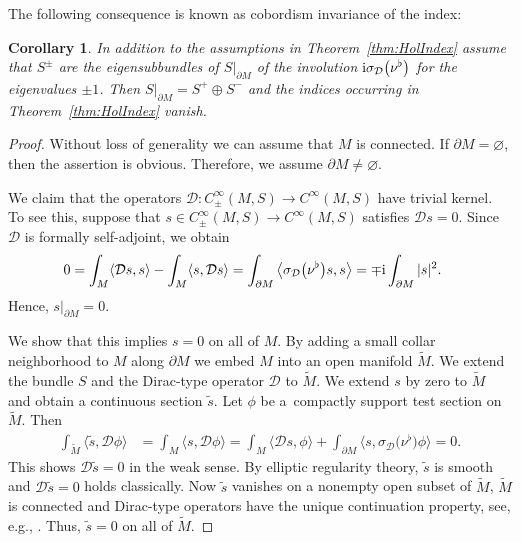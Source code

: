 \documentclass[pdftex]{sigma}
\numberwithin{equation}{section}
\newtheorem{Corollary}[Theorem]{Corollary}
\begin{document}
The following consequence is known as cobordism invariance of the index:

\begin{Corollary}\label{cor:CobInv}
In addition to the assumptions in Theorem~{\rm\ref{thm:HolIndex}} assume that $S^\pm$ are the eigensubbundles of $S|_{\partial M}$ of the involution ${\rm i}\sigma_{\mathcal{D}}\big(\nu^\flat\big)$ for the eigenvalues $\pm 1$.
Then $S|_{\partial M} = S^+ \oplus S^-$ and the indices occurring in Theorem~{\rm\ref{thm:HolIndex}} vanish.
\end{Corollary}

\begin{proof}
Without loss of generality we can assume that $M$ is connected.
If $\partial M=\varnothing$, then the assertion is obvious.
Therefore, we assume $\partial M\neq \varnothing$.

We claim that the operators $\mathcal{D}\colon C^\infty_\pm(M,S)\to C^\infty(M,S)$ have trivial kernel.
To see this, suppose that $s\in C^\infty_\pm(M,S)\to C^\infty(M,S)$ satisfies $\mathcal{D}s=0$.
Since $\mathcal{D}$ is formally self-adjoint, we obtain
\begin{align*}
0
&=
\int_M \langle \mathcal{D}s,s\rangle - \int_M \langle s, \mathcal{D}s\rangle
=
\int_{\partial M} \big\langle \sigma_{\mathcal{D}}\big(\nu^\flat\big)s,s\big\rangle
=
\mp {\rm i}\int_{\partial M} |s|^2 .
\end{align*}
Hence, $s|_{\partial M}=0$.

We show that this implies $s=0$ on all of $M$.
By adding a small collar neighborhood to $M$ along $\partial M$ we embed $M$ into an open manifold $\tilde M$.
We extend the bundle $S$ and the Dirac-type operator $\mathcal{D}$ to $\tilde M$.
We extend $s$ by zero to $\tilde M$ and obtain a continuous section $\tilde s$.
Let $\phi$ be a~compactly support test section on $\tilde M$.
Then
\begin{align*}
\int_{\tilde M}\langle \tilde s,\mathcal{D}\phi\rangle
&=
\int_M\langle s,\mathcal{D}\phi\rangle
=
\int_M\langle \mathcal{D}s,\phi\rangle + \int_{\partial M} \big\langle s,\sigma_{\mathcal{D}}\big(\nu^\flat\big)\phi\big\rangle
=
0.
\end{align*}
This shows $\mathcal{D}\tilde s=0$ in the weak sense.
By elliptic regularity theory, $\tilde s$ is smooth and $\mathcal{D}\tilde s=0$ holds classically.
Now $\tilde s$ vanishes on a nonempty open subset of $\tilde M$, $\tilde M$ is connected and Dirac-type operators have the unique continuation property, see, e.g., \cite[Theorem~8.2]{Booss-Wojciechowski}.
Thus, $\tilde s=0$ on all of $\tilde M$.
\end{proof}
\end{document}
